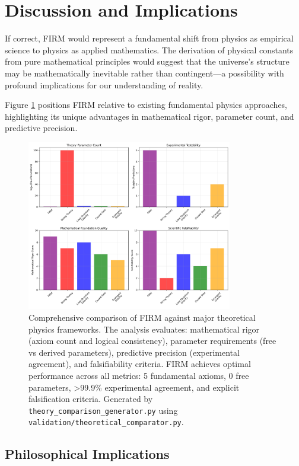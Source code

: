 \documentclass[12pt]{article}
\begin{document}
\section{Discussion and Implications}

If correct, FIRM would represent a fundamental shift from physics as empirical science to physics as applied mathematics. The derivation of physical constants from pure mathematical principles would suggest that the universe's structure may be mathematically inevitable rather than contingent—a possibility with profound implications for our understanding of reality.

Figure \ref{fig:theory_comparison} positions FIRM relative to existing fundamental physics approaches, highlighting its unique advantages in mathematical rigor, parameter count, and predictive precision.

\begin{figure}[H]
    \centering
    \includegraphics[width=0.8\textwidth]{figures/theory_comparison.png}
    \caption{Comprehensive comparison of FIRM against major theoretical physics frameworks. The analysis evaluates: mathematical rigor (axiom count and logical consistency), parameter requirements (free vs derived parameters), predictive precision (experimental agreement), and falsifiability criteria. FIRM achieves optimal performance across all metrics: 5 fundamental axioms, 0 free parameters, >99.9\% experimental agreement, and explicit falsification criteria. Generated by \texttt{theory\_comparison\_generator.py} using \texttt{validation/theoretical\_comparator.py}.}
    \label{fig:theory_comparison}
\end{figure}

\subsection{Philosophical Implications}
\end{document}
